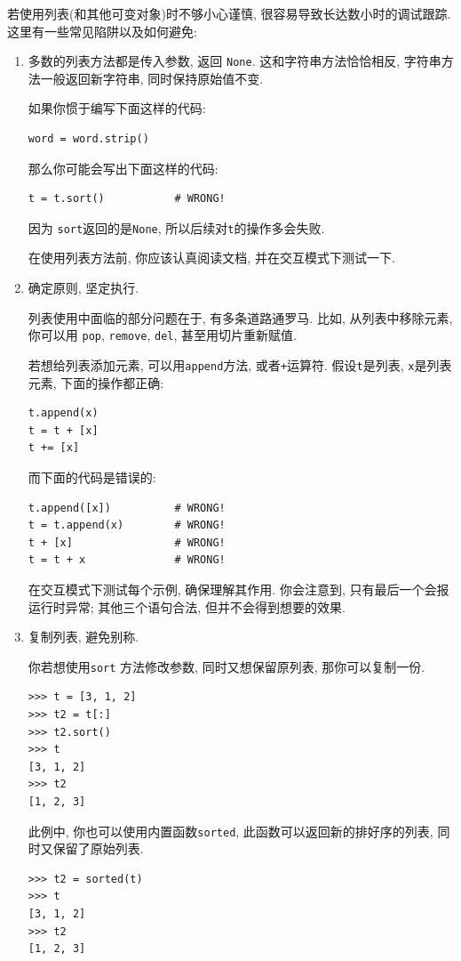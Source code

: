 \documentclass[10pt]{book}
\begin{document}
若使用列表(和其他可变对象)时不够小心谨慎, 很容易导致长达数小时的调试跟踪. 
这里有一些常见陷阱以及如何避免:

\begin{enumerate}

\item 多数的列表方法都是传入参数, 返回 {\tt None}. 
这和字符串方法恰恰相反, 字符串方法一般返回新字符串, 
同时保持原始值不变. 

如果你惯于编写下面这样的代码:

\begin{verbatim}
word = word.strip()
\end{verbatim}

那么你可能会写出下面这样的代码:

\begin{verbatim}
t = t.sort()           # WRONG!
\end{verbatim}

因为 {\tt sort}返回的是{\tt None}, 所以后续对{\tt t}的操作多会失败.

在使用列表方法前, 你应该认真阅读文档, 并在交互模式下测试一下. 

\item 确定原则, 坚定执行.

列表使用中面临的部分问题在于, 有多条道路通罗马. 
比如, 从列表中移除元素, 你可以用 {\tt pop}, {\tt remove}, {\tt del},
甚至用切片重新赋值. 

若想给列表添加元素, 可以用{\tt append}方法, 或者{\tt +}运算符. 
假设{\tt t}是列表, {\tt x}是列表元素, 下面的操作都正确: 

\begin{verbatim}
t.append(x)
t = t + [x]
t += [x]
\end{verbatim}

而下面的代码是错误的:

\begin{verbatim}
t.append([x])          # WRONG!
t = t.append(x)        # WRONG!
t + [x]                # WRONG!
t = t + x              # WRONG!
\end{verbatim}

在交互模式下测试每个示例, 确保理解其作用. 
你会注意到, 只有最后一个会报运行时异常;
其他三个语句合法, 但并不会得到想要的效果. 


\item 复制列表, 避免别称.

你若想使用{\tt sort} 方法修改参数, 同时又想保留原列表, 那你可以复制一份. 

\begin{verbatim}
>>> t = [3, 1, 2]
>>> t2 = t[:]
>>> t2.sort()
>>> t
[3, 1, 2]
>>> t2
[1, 2, 3]
\end{verbatim}

此例中, 你也可以使用内置函数{\tt sorted}, 
此函数可以返回新的排好序的列表, 同时又保留了原始列表. 

\begin{verbatim}
>>> t2 = sorted(t)
>>> t
[3, 1, 2]
>>> t2
[1, 2, 3]
\end{verbatim}

\end{enumerate}
\end{document}
